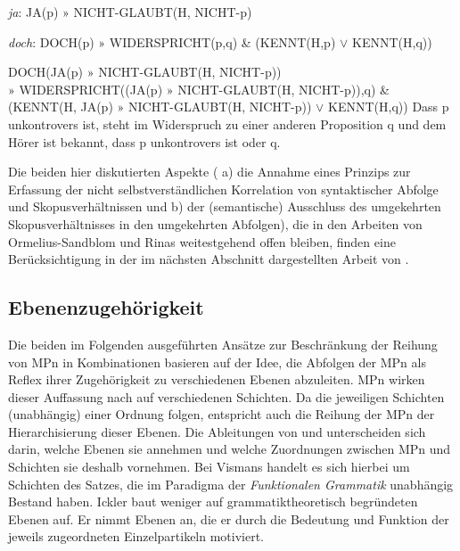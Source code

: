 \begin{exe}
	\ex\label{125} 	
	\textit{ja}: JA(p) $»$ NICHT-GLAUBT(H, NICHT-p)	
\end{exe}
\vspace{-0.65cm}
\begin{exe}
	\ex\label{126} 	
	\textit{doch}: DOCH(p) $»$ WIDERSPRICHT(p,q) \& (KENNT(H,p) $\lor$ KENNT(H,q))
\end{exe}

\begin{exe}
	\ex\label{127}
		\begin{xlist}	
			\ex\label{127a} DOCH(JA(p) $»$ NICHT-GLAUBT(H, NICHT-p))\\
			$»$ WIDERSPRICHT((JA(p) $»$ NICHT-GLAUBT(H, NICHT-p)),q) \& \\(KENNT(H, JA(p) $»$ NICHT-GLAUBT(H, NICHT-p)) $\lor$ KENNT(H,q))
			\ex\label{1247}  \glq Dass p unkontrovers ist, steht im Widerspruch zu einer anderen Proposition q und dem Hörer ist bekannt, dass p unkontrovers ist oder q.\grq {} 
		\end{xlist}
\end{exe}
Die beiden hier diskutierten Aspekte ( a) die Annahme eines Prinzips zur Erfassung der nicht selbstverständlichen Korrelation von syntaktischer Abfolge und Skopusverhältnissen und b) der (semantische) Ausschluss des umgekehrten Skopusverhältnisses in den umgekehrten Abfolgen), die in den Arbeiten von Ormelius-Sandblom und Rinas weitestgehend offen bleiben, finden eine Berücksichtigung in der im nächsten Abschnitt dargestellten Arbeit von \citet{Vismans1994}.

\subsection{Ebenenzugehörigkeit}
\label{sec:ebenen}
Die beiden im Folgenden ausgeführten Ansätze zur Beschränkung der Reihung von MPn in Kombinationen basieren auf der Idee, die Abfolgen der MPn als Reflex ihrer Zugehörigkeit zu verschiedenen Ebenen abzuleiten. MPn wirken dieser Auffassung nach auf verschiedenen Schichten. Da die jeweiligen Schichten (unabhängig) einer Ordnung folgen, entspricht auch die Reihung der MPn der Hie\-rarchisierung dieser Ebenen. Die Ableitungen von \citet{Vismans1994} und \citet{Ickler1994} unterscheiden sich darin, welche Ebenen sie annehmen und welche Zuordnungen zwischen MPn und Schichten sie deshalb vornehmen. Bei Vismans handelt es sich hierbei um Schichten des Satzes, die im Paradigma der \textit{Funktionalen Grammatik}  unabhängig Bestand haben. Ickler baut weniger auf grammatiktheoretisch begründeten Ebenen auf. Er nimmt Ebenen an, die er durch die Bedeutung und Funktion der jeweils zugeordneten Einzelpartikeln motiviert.

